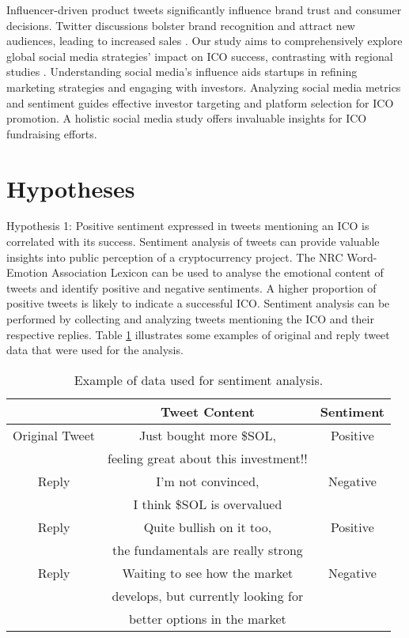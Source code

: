 \documentclass[runningheads]{llncs}
\begin{document}
Influencer-driven product tweets significantly influence brand trust and consumer decisions. Twitter discussions bolster brand recognition and attract new audiences, leading to increased sales \cite{appel2020future}. Our study aims to comprehensively explore global social media strategies' impact on ICO success, contrasting with regional studies \cite{chursook2022twitter}. Understanding social media's influence aids startups in refining marketing strategies and engaging with investors. Analyzing social media metrics and sentiment guides effective investor targeting and platform selection for ICO promotion. A holistic social media study offers invaluable insights for ICO fundraising efforts.




\section{Hypotheses}
Hypothesis 1: Positive sentiment expressed in tweets mentioning an ICO is correlated with its success. Sentiment analysis of tweets can provide valuable insights into public perception of a cryptocurrency project. The NRC Word-Emotion Association Lexicon can be used to analyse the emotional content of tweets and identify positive and negative sentiments. A higher proportion of positive tweets is likely to indicate a successful ICO. Sentiment analysis can be performed by collecting and analyzing tweets mentioning the ICO and their respective replies. Table \ref{tab1} illustrates some examples of original and reply tweet data that were used for the analysis.

\begin{table}[htbp]
\caption{Example of data used for sentiment analysis.}
\begin{center}
\begin{tabular}{|c|c|c|}
\hline
 & \textbf{Tweet Content} & \textbf{Sentiment} \\
 \hline
Original Tweet & Just bought more \$SOL, & Positive \\
& feeling great about this investment!! & \\
\hline
Reply & I'm not convinced,  & Negative \\
& I think \$SOL is overvalued & \\
\hline
Reply & Quite bullish on it too,  & Positive \\
&the fundamentals are really strong& \\
\hline
Reply & Waiting to see how the market  & Negative \\
& develops, but currently looking for & \\
&  better options in the market & \\
\hline
\end{tabular}
\label{tab1}
\end{center}
\end{table}
\end{document}

